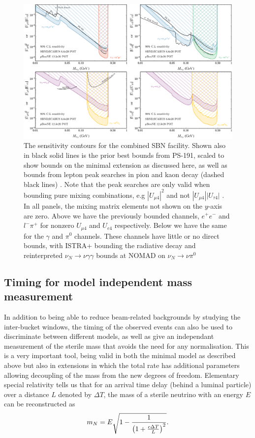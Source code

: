 \documentclass[11pt, a4paper]{article}
\def\ster{\ensuremath N}
\begin{document}
\begin{figure}[t]
\center
\includegraphics[width=1.0\textwidth]{figures/band_sbn.pdf}

\caption{\label{fig:band_sbn}The sensitivity contours for the combined SBN
facility. Shown also in black solid lines is the prior best bounds from PS-191,
scaled to show bounds on the minimal extension as discussed here, as well as bounds from lepton peak searches in pion and kaon decay \cite{PhysRevD.46.R885,PhysRevLett.68.3000}(dashed black lines) . Note that the peak searches are only valid when bounding pure mixing combinations, e.g $|U_{\mu 4}|^2$ and not $|U_{\mu 4}||U_{\tau 4}|$ . In all panels, the mixing matrix elements not shown on the $y$-axis are zero. Above we
have the previously bounded channels, $e^+e^-$ and $l^- \pi^+$ for nonzero
$U_{\mu 4}$ and $U_{e4}$ respectively. Below we have the same for the $\gamma$ and $\pi^0$ channels. These channels have little or no direct bounds, with ISTRA+ bounding the radiative decay\cite{Duk:2011yv} and reinterpreted $\nu_N \rightarrow \nu \gamma \gamma$ bounds at NOMAD on $\nu_N \rightarrow \nu \pi^0$ \cite{Gninenko:1998nn} }

\end{figure}

\subsection{\label{sec:timing_physics}Timing for model independent mass measurement}

In addition to being able to reduce beam-related backgrounds by studying the
inter-bucket windows, the timing of the observed events can also be used to
discriminate between different models, as well as give an independant
measurement of the sterile mass that avoids the need for any normalisation. This is a very important tool, being valid in both the minimal model as described above but also in extensions in which the total rate has additional parameters allowing decoupling of the mass from the new degrees of freedom. 
Elementary special relativity tells us that for an arrival time delay (behind a luminal particle) over a
distance $L$ denoted by $\Delta T$, the mass of a sterile neutrino with an
energy $E$ can be reconstructed as 
%
\[ m_{\ster} = E\sqrt{1-\frac{1}{\left(1+\frac{c\Delta T}{L}\right)^2}}. \]
\end{document}
